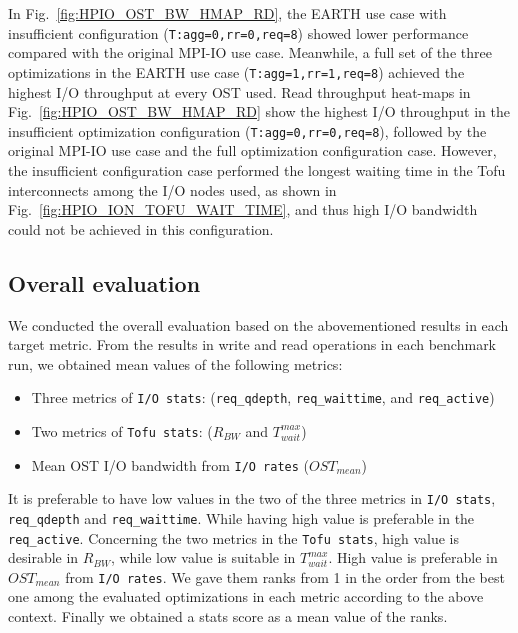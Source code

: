 \documentclass{jhps}
\begin{document}
%
In Fig.~\ref{fig:HPIO_OST_BW_HMAP_RD}, the EARTH use case with insufficient configuration
({\tt T:agg=0,rr=0,req=8}) showed lower performance compared with the original MPI-IO use case.
Meanwhile, a full set of the three optimizations in the EARTH use case
({\tt T:agg=1,rr=1,req=8}) achieved the highest I/O throughput at every OST used. 
Read throughput heat-maps in Fig.~\ref{fig:HPIO_OST_BW_HMAP_RD} show
the highest I/O throughput in the insufficient optimization configuration
({\tt T:agg=0,rr=0,req=8}), followed by the original MPI-IO use case
and the full optimization configuration case.
However, the insufficient configuration case performed the longest waiting time
in the Tofu interconnects among the I/O nodes used,
as shown in Fig.~\ref{fig:HPIO_ION_TOFU_WAIT_TIME},
and thus high I/O bandwidth could not be achieved in this configuration.

\subsection{Overall evaluation}
\label{ssec:overall_eval}

We conducted the overall evaluation based on the abovementioned results
in each target metric.
From the results in write and read operations in each benchmark run,
we obtained mean values of the following metrics:
%
\begin{itemize}
\item Three metrics of {\tt I/O stats}:
({\tt req\_qdepth}, {\tt req\_waittime}, and {\tt req\_active})
\item Two metrics of {\tt Tofu stats}: ($R_{BW}$ and $T_{wait}^{max}$)
\item Mean OST I/O bandwidth from {\tt I/O rates} ($OST_{mean}$)
\end{itemize}
%
It is preferable to have low values in the two of the three metrics
in {\tt I/O stats}, {\tt req\_qdepth} and {\tt req\_waittime}.
While having high value is preferable in the {\tt req\_active}.
Concerning the two metrics in the {\tt Tofu stats},
high value is desirable in $R_{BW}$, while low value is
suitable in $T_{wait}^{max}$.
High value is preferable in $OST_{mean}$ from {\tt I/O rates}.
We gave them ranks from 1 in the order from the best one
among the evaluated optimizations in each metric according to
the above context.
Finally we obtained a stats score as a mean value of the ranks.
\end{document}
